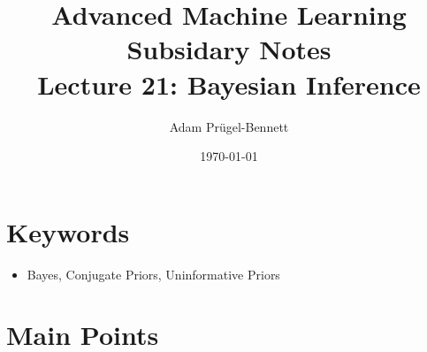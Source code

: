 \documentclass[11pt]{article}
\author{Adam Prügel-Bennett}
\date{\today}
\title{Advanced Machine Learning Subsidary Notes\\\medskip
\large Lecture 21: Bayesian Inference}
\begin{document}
\maketitle

\section{Keywords}
\label{sec:orga81387c}
\begin{itemize}
\item Bayes, Conjugate Priors, Uninformative Priors
\end{itemize}

\section{Main Points}
\label{sec:org40605cc}
\end{document}
